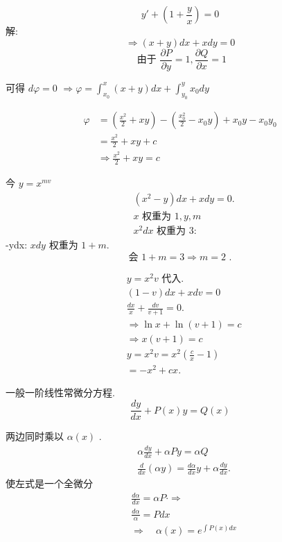 \begin{examplebox}{
$$
y'+\left(1+\frac{y}{x}\right)=0
$$
}
解:
$$
\Rightarrow(x+y) d x+x d y=0
$$
$$
\text { 由于 } \frac{\partial P}{\partial y}=1, \frac{\partial Q}{\partial x}=1
$$

可得 $d \varphi=0$
$\Rightarrow \varphi=\int_{x_0}^x(x+y) d x+\int_{y_0}^y x_0 d y$

\begin{equation}
    \begin{aligned}
    \varphi & =\left(\frac{x^2}{2}+x y\right)-\left(\frac{x_0^2}{2}-x_0 y\right)+x_0 y-x_0 y_0 \\
    & =\frac{x^2}{2}+x y+c \\
    & \Rightarrow \frac{x^2}{2}+x y=c
    \end{aligned}
    \end{equation}
\end{examplebox}


今 $y=x^{m v}$
$$
\begin{aligned}
& \left(x^2-y\right) d x+x d y=0 . \\
& x \text { 权重为 } 1, y, m \\
& x^2 d x \text { 权重为 } 3:
\end{aligned}
$$
-ydx: $x d y$ 权重为 $1+m$.
$$
\text { 会 } 1+m=3 \Rightarrow m=2 \text { . }
$$


$$
\begin{aligned}
& y=x^2 v \text { 代入. } \\
& (1-v) d x+x d v=0 \\
& \frac{d x}{x}+\frac{d v}{v+1}=0 . \\
& \Rightarrow \ln x+\ln (v+1)=c \\
& \Rightarrow x(v+1)=c \\
& y=x^2 v=x^2\left(\frac{c}{x}-1\right) \\
& =-x^2+c x .
\end{aligned}
$$


一般一阶线性常微分方程.
$$
\frac{d y}{d x}+P(x) y=Q(x)
$$

两边同时乘以 $\alpha(x)$ .
$$
\begin{aligned}
& \alpha \frac{d y}{d x}+\alpha Py=\alpha Q \\
& \frac{d}{d x}(\alpha y)=\frac{d \alpha}{d x} y+\alpha \frac{d y}{d x} .
\end{aligned}
$$
使左式是一个全微分
$$
\begin{aligned}
& \frac{d \alpha}{d x}=\alpha P\cdot \Rightarrow \\
& \frac{d \alpha}{\alpha}=P d x \\
& \Rightarrow \quad \alpha(x)=e^{\int P(x) d x}
\end{aligned}
$$


